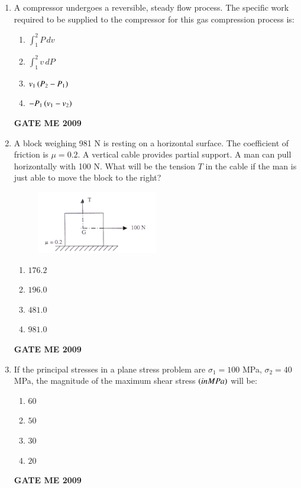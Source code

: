 \documentclass[journal]{IEEEtran}
\begin{document}
\begin{enumerate}[leftmargin=0pt]
\item A compressor undergoes a reversible, steady flow process. The specific work required to be supplied to the compressor for this gas compression process is:
  \begin{enumerate}[label=(\alph*)]
    \item $\displaystyle \int_{1}^{2} P \, dv$
    \item $\displaystyle \int_{1}^{2} v \, dP$
    \item $v_1 \left(P_2-P_1\right)$
    \item $-P_1\left(v_1 - v_2\right)$
  \end{enumerate}
  \hfill{\textbf{GATE ME 2009}}


\item A block weighing 981 N is resting on a horizontal surface. The coefficient of friction is $\mu=0.2$. A vertical cable provides partial support. A man can pull horizontally with 100 N. What will be the tension $T$  in the cable if the man is just able to move the block to the right?

    \begin{figure}[h]
      \centering
      \includegraphics[width=0.5\textwidth]{Figs/image (2).png}
      \caption{}
    \end{figure}



  \begin{enumerate}[label=(\alph*)]
    \item $176.2$
    \item $196.0$
    \item $481.0$
    \item $981.0$
  \end{enumerate}
  \hfill{\textbf{GATE ME 2009}}

\item If the principal stresses in a plane stress problem are $\sigma_1 = 100$ MPa, $\sigma_2 = 40$ MPa, the magnitude of the maximum shear stress $\left(in MPa\right)$ will be:
  \begin{enumerate}[label=(\alph*)]
    \item $60$
    \item $50$
    \item $30$
    \item $20$
  \end{enumerate}
  \hfill{\textbf{GATE ME 2009}}


\end{enumerate}
\end{document}
